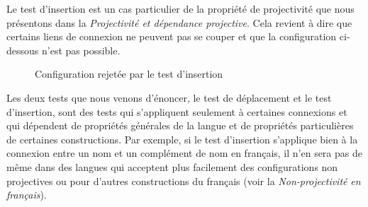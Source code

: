 \z
Le test d’insertion est un cas particulier de la propriété de projectivité que nous présentons dans la  \textit{Projectivité et dépendance projective}. Cela revient à dire que certains liens de connexion ne peuvent pas se couper et que la configuration ci-dessous n’est pas possible.

\begin{figure}
\caption{\label{fig:}Configuration rejetée par le test d’insertion}
\end{figure}

Les deux tests que nous venons d’énoncer, le test de déplacement et le test d’insertion, sont des tests qui s’appliquent seulement à certaines connexions et qui dépendent de propriétés générales de la langue et de propriétés particulières de certaines constructions. Par exemple, si le test d’insertion s’applique bien à la connexion entre un nom et un complément de nom en français, il n’en sera pas de même dans des langues qui acceptent plus facilement des configurations non projectives ou pour d’autres constructions du français (voir la  \textit{Non-projectivité} \textit{en français}).

